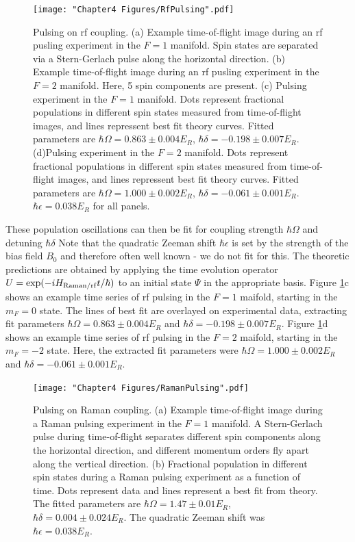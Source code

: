 \begin{figure}
	\texttt{[image: "Chapter4 Figures/RfPulsing".pdf]}
\caption{Pulsing on rf coupling. (a) Example time-of-flight image during an rf pusling experiment in the $F=1$ manifold. Spin states are separated via a Stern-Gerlach pulse along the horizontal direction. (b) Example time-of-flight image during an rf pusling experiment in the $F=2$ manifold. Here, 5 spin components are present.  (c) Pulsing experiment in the $F=1$ manifold. Dots represent fractional populations in different spin states measured from time-of-flight images, and lines repressent best fit theory curves.  Fitted parameters are $\hbar\Omega=0.863\pm0.004 E_R$, $\hbar\delta=-0.198\pm0.007 E_R$. (d)Pulsing experiment in the $F=2$ manifold. Dots represent fractional populations in different spin states measured from time-of-flight images, and lines repressent best fit theory curves. Fitted parameters are $\hbar\Omega=1.000\pm0.002 E_R$, $\hbar\delta = -0.061\pm0.001 E_R$. $\hbar\epsilon=0.038 E_R$ for all panels.}
\label{fig:RfPulsing}
\end{figure}

These population oscillations can then be fit for coupling strength $\hbar\Omega$ and detuning $\hbar\delta$ Note that the quadratic Zeeman shift $\hbar\epsilon$ is set by the strength of the bias field $B_0$ and therefore often well known - we do not fit for this. The theoretic predictions are obtained by applying the time evolution operator $U={\rm exp}(-i H_{\rm Raman/rf} t/\hbar)$ to an initial state $\Psi$ in the appropriate basis. Figure \ref{fig:RfPulsing}c shows an example time series of rf pulsing in the $F=1$ maifold, starting in the $m_F=0$ state. The lines of best fit are overlayed on experimental data, extracting fit parameters $\hbar\Omega=0.863\pm0.004 E_R$ and $\hbar\delta=-0.198\pm0.007 E_R$. Figure \ref{fig:RfPulsing}d shows an example time series of rf pulsing in the $F=2$ maifold, starting in the $m_F=-2$ state. Here, the extracted fit parameters were $\hbar\Omega=1.000\pm0.002 E_R$ and $\hbar\delta = -0.061\pm0.001 E_R$.

\begin{figure}
	\texttt{[image: "Chapter4 Figures/RamanPulsing".pdf]}
\caption{Pulsing on Raman coupling. (a) Example time-of-flight image during a Raman pulsing experiment in the $F=1$ manifold. A Stern-Gerlach pulse during time-of-flight separates different spin components along the horizontal direction, and different momentum orders fly apart along the vertical direction. (b) Fractional population in different spin states during a Raman pulsing experiment as a function of time. Dots represent data and lines represent a best fit from theory. The fitted parameters are $\hbar\Omega=1.47\pm0.01 E_R$, $\hbar\delta = 0.004\pm0.024 E_R$. The quadratic Zeeman shift was $\hbar\epsilon=0.038 E_R$. }
\label{fig:RamanPulsing}
\end{figure}

